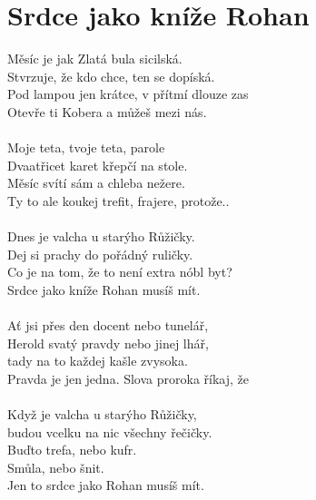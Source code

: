 \section{Srdce jako kníže Rohan}
Měsíc je jak Zlatá bula sicilská.\\
Stvrzuje, že kdo chce, ten se dopíská.\\
Pod lampou jen krátce, v přítmí dlouze zas\\
Otevře ti Kobera a můžeš mezi nás.\\
\\
Moje teta, tvoje teta, parole\\
Dvaatřicet karet křepčí na stole.\\
Měsíc svítí sám a chleba nežere.\\
Ty to ale koukej trefit, frajere, protože..\\
\\
Dnes je valcha u starýho Růžičky.\\
Dej si prachy do pořádný ruličky.\\
Co je na tom, že to není extra nóbl byt?\\
Srdce jako kníže Rohan musíš mít.\\
\\
Ať jsi přes den docent nebo tunelář,\\
Herold svatý pravdy nebo jinej lhář,\\
tady na to každej kašle zvysoka.\\
Pravda je jen jedna. Slova proroka říkaj, že\\
\\
Když je valcha u starýho Růžičky,\\
budou vcelku na nic všechny řečičky.\\
Buďto trefa, nebo kufr.\\
Smůla, nebo šnit.\\
Jen to srdce jako Rohan musíš mít.\\
